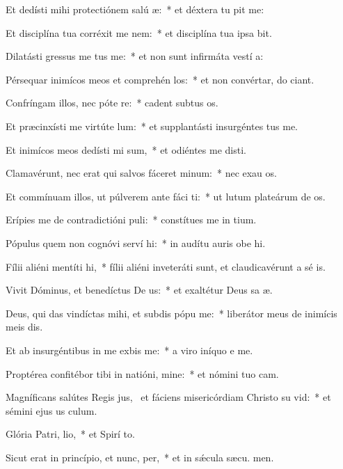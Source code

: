 \item Et dedísti mihi protectiónem salú æ:~* et déxtera tu pit me:
\item Et disciplína tua corréxit me  nem:~* et disciplína tua ipsa  bit.
\item Dilatásti gressus me tus me:~* et non sunt infirmáta vestí a:
\item Pérsequar inimícos meos et comprehén los:~* et non convértar, do ciant.
\item Confríngam illos, nec póte re:~* cadent subtus  os.
\item Et præcinxísti me virtúte  lum:~* et supplantásti insurgéntes   tus me.
\item Et inimícos meos dedísti mi sum,~* et odiéntes me disti.
\item Clamavérunt, nec erat qui salvos fáceret  minum:~* nec exau os.
\item Et commínuam illos, ut púlverem ante fáci ti:~* ut lutum plateárum de os.
\item Erípies me de contradictióni puli:~* constítues me in  tium.
\item Pópulus quem non cognóvi serví hi:~* in audítu auris obe hi.
\item Fílii aliéni mentíti  hi,~* fílii aliéni inveteráti sunt, et claudicavérunt a sé is.
\item Vivit Dóminus, et benedíctus De us:~* et exaltétur Deus sa æ.
\item Deus, qui das vindíctas mihi, et subdis pópu  me:~* liberátor meus de inimícis meis dis.
\item Et ab insurgéntibus in me exbis me:~* a viro iníquo e me.
\item Proptérea confitébor tibi in natióni, mine:~* et nómini tuo  cam.
\item Magníficans salútes Regis jus,~\pscross{} et fáciens misericórdiam Christo su vid:~* et sémini ejus us  culum.
\item Glória Patri,  lio,~* et Spirí to.
\item Sicut erat in princípio, et nunc,  per,~* et in sǽcula sæcu. men.
